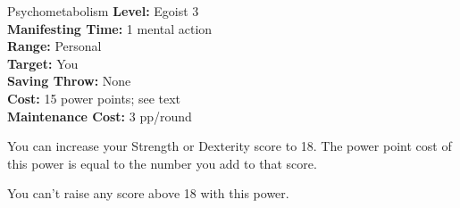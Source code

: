 {Psychometabolism}
{
    \textbf{Level:}
    Egoist 3\\
    \textbf{Manifesting Time:}
    1 mental action\\
    \textbf{Range:}
    Personal\\
    \textbf{Target:}
    You\\
    \textbf{Saving Throw:}
    None\\
    \textbf{Cost:}
    15 power points; see text\\
    \textbf{Maintenance Cost:}
    3 pp/round\\
}
{
    You can increase your Strength or Dexterity score to 18. The power point cost of this power is equal to the number you add to that score.

    You can't raise any score above 18 with this power.
}
